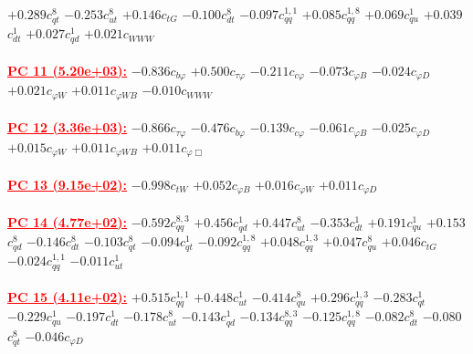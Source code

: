 \documentclass{article}
\begin{document}
{$+0.289$}{\rm $c_{qt}^{8}$}
{$-0.253$}{\rm $c_{ut}^{8}$}
{$+0.146$}{\rm $c_{tG}$}
{$-0.100$}{\rm $c_{dt}^{8}$}
{$-0.097$}{\rm $c_{qq}^{1,1}$}
{$+0.085$}{\rm $c_{qq}^{1,8}$}
{$+0.069$}{\rm $c_{qu}^{1}$}
{$+0.039$}{\rm $c_{dt}^{1}$}
{$+0.027$}{\rm $c_{qd}^{1}$}
{$+0.021$}{\rm $c_{WWW}$}
 \nonumber \\ \nonumber \\
\noindent \textcolor{red}{\underline{\bf{PC 11} (5.20e+03):}}
{$-0.836$}{\rm $c_{b \varphi}$}
{$+0.500$}{\rm $c_{\tau \varphi}$}
{$-0.211$}{\rm $c_{c \varphi}$}
{$-0.073$}{\rm $c_{\varphi B}$}
{$-0.024$}{\rm $c_{\varphi D}$}
{$+0.021$}{\rm $c_{\varphi W}$}
{$+0.011$}{\rm $c_{\varphi WB}$}
{$-0.010$}{\rm $c_{WWW}$}
 \nonumber \\ \nonumber \\
\noindent \textcolor{red}{\underline{\bf{PC 12} (3.36e+03):}}
{$-0.866$}{\rm $c_{\tau \varphi}$}
{$-0.476$}{\rm $c_{b \varphi}$}
{$-0.139$}{\rm $c_{c \varphi}$}
{$-0.061$}{\rm $c_{\varphi B}$}
{$-0.025$}{\rm $c_{\varphi D}$}
{$+0.015$}{\rm $c_{\varphi W}$}
{$+0.011$}{\rm $c_{\varphi WB}$}
{$+0.011$}{\rm $c_{\varphi \Box}$}
 \nonumber \\ \nonumber \\
\noindent \textcolor{red}{\underline{\bf{PC 13} (9.15e+02):}}
{$-0.998$}{\rm $c_{tW}$}
{$+0.052$}{\rm $c_{\varphi B}$}
{$+0.016$}{\rm $c_{\varphi W}$}
{$+0.011$}{\rm $c_{\varphi D}$}
 \nonumber \\ \nonumber \\
\noindent \textcolor{red}{\underline{\bf{PC 14} (4.77e+02):}}
{$-0.592$}{\rm $c_{qq}^{8,3}$}
{$+0.456$}{\rm $c_{qd}^{1}$}
{$+0.447$}{\rm $c_{ut}^{8}$}
{$-0.353$}{\rm $c_{dt}^{1}$}
{$+0.191$}{\rm $c_{qu}^{1}$}
{$+0.153$}{\rm $c_{qd}^{8}$}
{$-0.146$}{\rm $c_{dt}^{8}$}
{$-0.103$}{\rm $c_{qt}^{8}$}
{$-0.094$}{\rm $c_{qt}^{1}$}
{$-0.092$}{\rm $c_{qq}^{1,8}$}
{$+0.048$}{\rm $c_{qq}^{1,3}$}
{$+0.047$}{\rm $c_{qu}^{8}$}
{$+0.046$}{\rm $c_{tG}$}
{$-0.024$}{\rm $c_{qq}^{1,1}$}
{$-0.011$}{\rm $c_{ut}^{1}$}
 \nonumber \\ \nonumber \\
\noindent \textcolor{red}{\underline{\bf{PC 15} (4.11e+02):}}
{$+0.515$}{\rm $c_{qq}^{1,1}$}
{$+0.448$}{\rm $c_{ut}^{1}$}
{$-0.414$}{\rm $c_{qu}^{8}$}
{$+0.296$}{\rm $c_{qq}^{1,3}$}
{$-0.283$}{\rm $c_{qt}^{1}$}
{$-0.229$}{\rm $c_{qu}^{1}$}
{$-0.197$}{\rm $c_{dt}^{1}$}
{$-0.178$}{\rm $c_{ut}^{8}$}
{$-0.143$}{\rm $c_{qd}^{1}$}
{$-0.134$}{\rm $c_{qq}^{8,3}$}
{$-0.125$}{\rm $c_{qq}^{1,8}$}
{$-0.082$}{\rm $c_{dt}^{8}$}
{$-0.080$}{\rm $c_{qt}^{8}$}
{$-0.046$}{\rm $c_{\varphi D}$}
\end{document}
